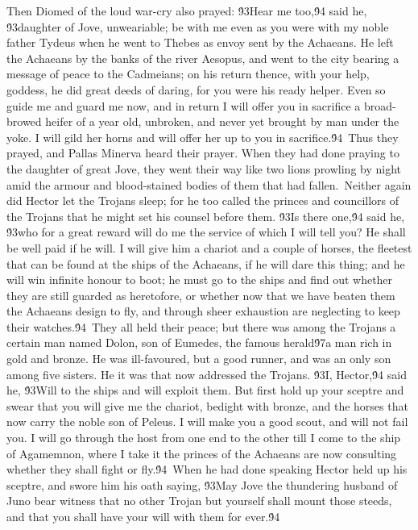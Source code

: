 {Then Diomed of the loud war-cry also prayed: \'93Hear me too,\'94 said he, \'93daughter of Jove, unweariable; be with me even as you were with my noble father Tydeus when he went to Thebes as envoy sent by the Achaeans. He left the Achaeans by the banks of the river Aesopus, and went to the city bearing a message of peace to the Cadmeians; on his return thence, with your help, goddess, he did great deeds of daring, for you were his ready helper. Even so guide me and guard me now, and in return I will offer you in sacrifice a broad-browed heifer of a year old, unbroken, and never yet brought by man under the yoke. I will gild her horns and will offer her up to you in sacrifice.\'94\
Thus they prayed, and Pallas Minerva heard their prayer. When they had done praying to the daughter of great Jove, they went their way like two lions prowling by night amid the armour and blood-stained bodies of them that had fallen.\
Neither again did Hector let the Trojans sleep; for he too called the princes and councillors of the Trojans that he might set his counsel before them. \'93Is there one,\'94 said he, \'93who for a great reward will do me the service of which I will tell you? He shall be well paid if he will. I will give him a chariot and a couple of horses, the fleetest that can be found at the ships of the Achaeans, if he will dare this thing; and he will win infinite honour to boot; he must go to the ships and find out whether they are still guarded as heretofore, or whether now that we have beaten them the Achaeans design to fly, and through sheer exhaustion are neglecting to keep their watches.\'94\
They all held their peace; but there was among the Trojans a certain man named Dolon, son of Eumedes, the famous herald\'97a man rich in gold and bronze. He was ill-favoured, but a good runner, and was an only son among five sisters. He it was that now addressed the Trojans. \'93I, Hector,\'94 said he, \'93Will to the ships and will exploit them. But first hold up your sceptre and swear that you will give me the chariot, bedight with bronze, and the horses that now carry the noble son of Peleus. I will make you a good scout, and will not fail you. I will go through the host from one end to the other till I come to the ship of Agamemnon, where I take it the princes of the Achaeans are now consulting whether they shall fight or fly.\'94\
When he had done speaking Hector held up his sceptre, and swore him his oath saying, \'93May Jove the thundering husband of Juno bear witness that no other Trojan but yourself shall mount those steeds, and that you shall have your will with them for ever.\'94\
}

